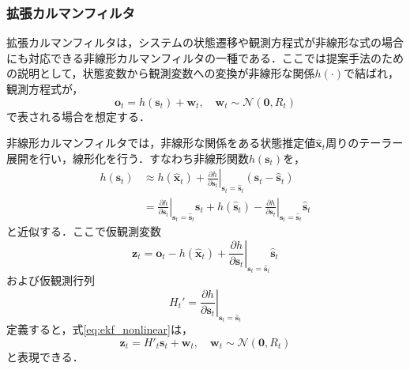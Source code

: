         \subsubsection{拡張カルマンフィルタ}
        拡張カルマンフィルタ\cite{bishop2001introduction}は，システムの状態遷移や観測方程式が非線形な式の場合にも対応できる非線形カルマンフィルタの一種である．ここでは提案手法のための説明として，状態変数から観測変数への変換が非線形な関係$h(\cdot)$で結ばれ，観測方程式が，
        \begin{equation}
            \label{eq:ekf_nonlinear}
            \bm{o}_t = h(\bm{s}_t) + \bm{w}_t, \quad \bm{w}_t \sim \mathcal{N}(\bm{0}, R_t)
        \end{equation}
        で表される場合を想定する．

        非線形カルマンフィルタでは，非線形な関係をある状態推定値$\hat{\bm{x}}_t$周りのテーラー展開を行い，線形化を行う．すなわち非線形関数$h(\bm{s}_t)$を，
        \begin{equation}
            \label{eq:ekf_linearization}
            \begin{aligned}
                h(\bm{s}_t) &\approx h(\hat{\bm{x}}_t) + \left.\frac{\partial h}{\partial \bm{s}_t}\right|_{\bm{s}_t = \hat{\bm{s}}_t} (\bm{s}_t - \hat{\bm{s}}_t)
                \\ &= \left.\frac{\partial h}{\partial \bm{s}_t}\right|_{\bm{s}_t = \hat{\bm{s}}_t} \bm{s}_t + h(\hat{\bm{s}}_t) - \left.\frac{\partial h}{\partial \bm{s}_t}\right|_{\bm{s}_t = \hat{\bm{s}}_t} \hat{\bm{s}}_t
            \end{aligned}
        \end{equation}
        と近似する．ここで仮観測変数
        \begin{equation}
            \label{eq:ekf_new_observation}
            \bm{z}_t = \bm{o}_t - h(\hat{\bm{x}}_t) + \left.\frac{\partial h}{\partial \bm{s}_t}\right|_{\bm{s}_t = \hat{\bm{s}}_t} \hat{\bm{s}}_t
        \end{equation}
        および仮観測行列
        \begin{equation}
            \label{eq:ekf_new_observation_matrix}
            H_t' = \left.\frac{\partial h}{\partial \bm{s}_t}\right|_{\bm{s}_t = \hat{\bm{s}}_t}
        \end{equation}
        定義すると，式\ref{eq:ekf_nonlinear}は，
        \begin{equation}
            \label{eq:ekf_linearization_with_z}
            \bm{z}_t = H'_t \bm{s}_t + \bm{w}_t, \quad \bm{w}_t \sim \mathcal{N}(\bm{0}, R_t) 
        \end{equation}
        と表現できる．

